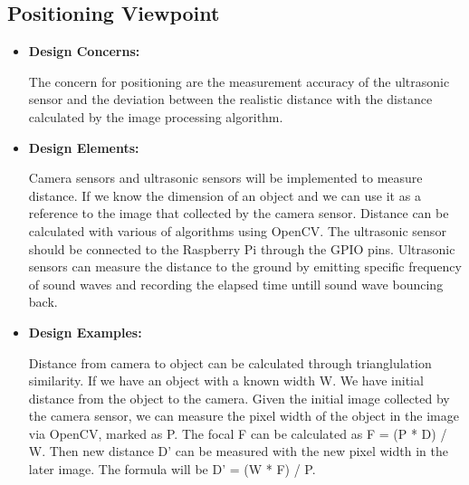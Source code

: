 \documentclass[onecolumn, draftclsnofoot,10pt, compsoc]{IEEEtran}
\begin{document}
\subsection{Positioning Viewpoint} %
\begin{itemize}
\item{ \textbf{Design Concerns:}}

The concern for positioning are the measurement accuracy of the ultrasonic sensor and the deviation between the realistic distance with the distance calculated by the image processing algorithm.\\
\item{ \textbf{Design Elements:}}

Camera sensors and ultrasonic sensors will be implemented to measure distance. If we know the dimension of an object and we can use it as a reference to the image that collected by the camera sensor. Distance can be calculated with various of algorithms using OpenCV. The ultrasonic sensor should be connected to the Raspberry Pi through the GPIO pins. Ultrasonic sensors can measure the distance to the ground by emitting specific frequency of sound waves and recording the elapsed time untill sound wave bouncing back.\\
\item{ \textbf{Design Examples:}} %

Distance from camera to object can be calculated through trianglulation similarity. \cite{r13} If we have an object with a known width W. We have initial distance from the object to the camera. Given the initial image collected by the camera sensor, we can measure the pixel width of the object in the image via OpenCV, marked as P. The focal F can be calculated as F = (P * D) / W. Then new distance D’ can be measured with the new pixel width in the later image. The formula will be D’ = (W * F) / P.\\
\end{itemize}
\end{document}
